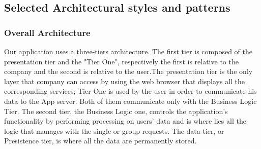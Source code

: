 \documentclass{article}
\begin{document}
\subsection{Selected Architectural styles and patterns}
\subsubsection{Overall Architecture}
Our application uses a three-tiers architecture. \newline
The first tier is composed of the presentation tier and the "Tier One", respectively the first is relative to the company and the second is relative to the user.The presentation tier is the only layer that company can access by using the web browser that displays all the corresponding services; Tier One is used by the user in order to communicate his data to the App server. Both of them communicate only with the Business Logic Tier. \newline
The second tier, the Business Logic one, controls the application’s functionality by performing processing on users' data and is where lies all the logic that manages with the single or group requests. \newline
The data tier, or Presistence tier, is where all the data are permanently stored.
\end{document}
